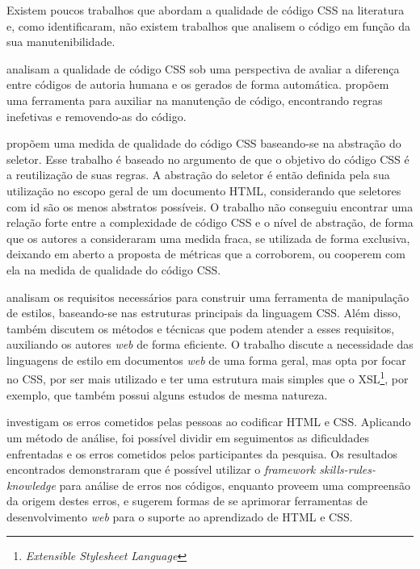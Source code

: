Existem poucos trabalhos que abordam a qualidade de código CSS na literatura e, como  identificaram, não existem trabalhos que analisem o código em função da sua manutenibilidade.

 analisam a qualidade de código CSS sob uma perspectiva de avaliar a diferença entre códigos de autoria humana e os gerados de forma automática.  propõem uma ferramenta para auxiliar na manutenção de código, encontrando regras inefetivas e removendo-as do código.

 propõem uma medida de qualidade do código CSS baseando-se na abstração do seletor. Esse trabalho é baseado no argumento de que o objetivo do código CSS é a reutilização de suas regras. A abstração do seletor é então definida pela sua utilização no escopo geral de um documento HTML, considerando que seletores com id são os menos abstratos possíveis. O trabalho não conseguiu encontrar uma relação forte entre a complexidade de código CSS e o nível de abstração, de forma que os autores a consideraram uma medida fraca, se utilizada de forma exclusiva, deixando em aberto a proposta de métricas que a corroborem, ou cooperem com ela na medida de qualidade do código CSS.

 analisam os requisitos necessários para construir uma ferramenta de manipulação de estilos, baseando-se nas estruturas principais da linguagem CSS. Além disso, também discutem os métodos e técnicas que podem atender a esses requisitos, auxiliando os autores \textit{web} de forma eficiente. O trabalho discute a necessidade das linguagens de estilo em documentos \textit{web} de uma forma geral, mas opta por focar no CSS, por ser mais utilizado e ter uma estrutura mais simples que o XSL\footnote{\textit{Extensible Stylesheet Language}}, por exemplo, que também possui alguns estudos de mesma natureza.

 investigam os erros cometidos pelas pessoas ao codificar HTML e CSS. Aplicando um método de análise, foi possível dividir em seguimentos as dificuldades enfrentadas e os erros cometidos pelos participantes da pesquisa. Os resultados encontrados demonstraram que é possível utilizar o \textit{framework skills-rules-knowledge} para análise de erros nos códigos, enquanto proveem uma compreensão da origem destes erros, e sugerem formas de se aprimorar ferramentas de desenvolvimento \textit{web} para o suporte ao aprendizado de HTML e CSS.

